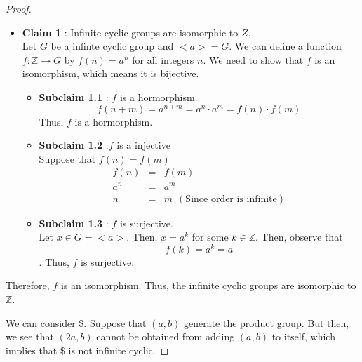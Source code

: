 \documentclass[
]{book}
\providecommand{\tightlist}{%
  \setlength{\itemsep}{0pt}\setlength{\parskip}{0pt}}
\theoremstyle{definition}
\theoremstyle{definition}
\theoremstyle{definition}
\theoremstyle{definition}
\theoremstyle{remark}
\begin{document}
\begin{proof}
\\

\begin{itemize}
\item
  \textbf{Claim 1} : Infinite cyclic groups are isomorphic to \(Z\).\\
  Let \(G\) be a infinte cyclic group and \(<a>=G\).
  We can define a function \(f: \mathbb{Z} \rightarrow G\) by \(f(n) = a^n\) for all integers \(n\). We need to show that \(f\) is an isomorphism, which means it is bijective.

  \begin{itemize}
  \tightlist
  \item
    \textbf{Subclaim 1.1} : \(f\) is a hormorphism.\\
    \[f(n+m)=a^{n+m}=a^n \cdot a^m =f(n)\cdot f(m)\]
    Thus, \(f\) is a hormorphism.
  \item
    \textbf{Subclaim 1.2} :\(f\) is a injective\\
    Suppose that \(f(n)=f(m)\)
    \begin{eqnarray}
      f(n)&=&f(m)\\
      a^n &=& a^m \\
      n&=& m ~~(\text{Since order is infinite})
    \end{eqnarray}
  \item
    \textbf{Subclaim 1.3} : \(f\) is surjective.\\
    Let \(x\in G=<a>\). Then, \(x=a^k\) for some \(k\in \mathbb{Z}\). Then, observe that
    \[f(k)=a^k=a \].
    Thus, \(f\) is surjective.
  \end{itemize}
\end{itemize}

Therefore, \(f\) is an isomorphism. Thus, the infinite cyclic groups are isomorphic to \(\mathbb{Z}\).

\hfill\break
\hfill\break
We can consider \$\times {}. Suppose that \((a, b)\) generate the product group. But then, we see that \((2a, b)\) cannot be obtained from adding \((a, b)\) to itself, which implies that \$\times {} is not infinite cyclic.
\end{proof}

\hfill\break
\hfill\break
\hfill\break
\end{document}
